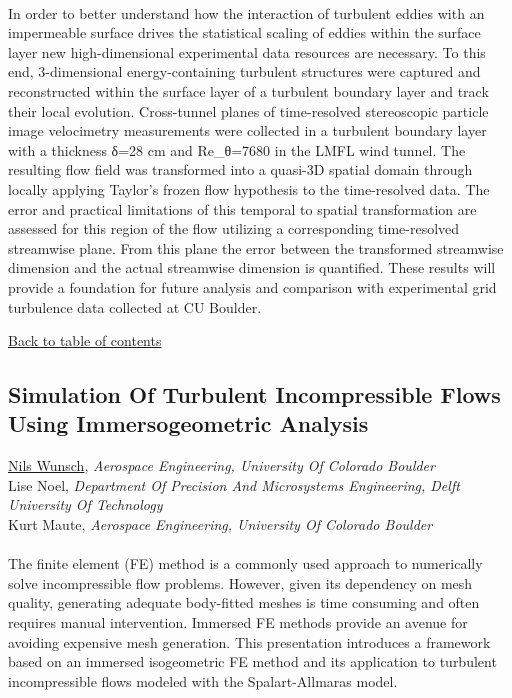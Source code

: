 \vspace{-0.1 in} \\ 
\noindent In order to better understand how the interaction of turbulent eddies with an impermeable surface drives the statistical scaling of eddies within the surface layer new high-dimensional experimental data resources are necessary. To this end, 3-dimensional energy-containing turbulent structures were captured and reconstructed within the surface layer of a turbulent boundary layer and track their local evolution. Cross-tunnel planes of time-resolved stereoscopic particle image velocimetry measurements were collected in a turbulent boundary layer with a thickness δ=28 cm and Re_θ=7680 in the LMFL wind tunnel. The resulting flow field was transformed into a quasi-3D spatial domain through locally applying Taylor’s frozen flow hypothesis to the time-resolved data. The error and practical limitations of this temporal to spatial transformation are assessed for this region of the flow utilizing a corresponding time-resolved streamwise plane. From this plane the error between the transformed streamwise dimension and the actual streamwise dimension is quantified. These results will provide a foundation for future analysis and comparison with experimental grid turbulence data collected at CU Boulder. \\ 
\begin{flushright}\vspace{-0.2 in}\hyperlink{toc}{Back to table of contents}\end{flushright}\vspace{-0.2 in}
\hypertarget{NilsWunsch}{\subsection*{\color{CUGOLD} Simulation Of Turbulent Incompressible Flows Using Immersogeometric Analysis}} \vsp 
\underline{Nils Wunsch}, \textit{Aerospace Engineering, University Of Colorado Boulder}\\ 
{Lise Noel}, \textit{Department Of Precision And Microsystems Engineering, Delft University Of Technology}\\ 
{Kurt Maute}, \textit{Aerospace Engineering, University Of Colorado Boulder}\\ 
\vspace{-0.1 in} \\ 
\noindent The finite element (FE) method is a commonly used approach to numerically solve incompressible flow problems. However, given its dependency on mesh quality, generating adequate body-fitted meshes is time consuming and often requires manual intervention. Immersed FE methods provide an avenue for avoiding expensive mesh generation. This presentation introduces a framework based on an immersed isogeometric FE method and its application to turbulent incompressible flows modeled with the Spalart-Allmaras model. \\ 
